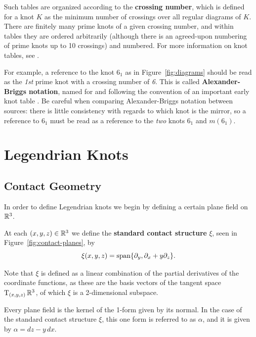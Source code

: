 Such tables are organized according to the \textbf{crossing number}, which is defined for a knot $K$ as the minimum number of crossings over all regular diagrams of $K$.
There are finitely many prime knots of a given crossing number, and within tables they are ordered arbitrarily (although there is an agreed-upon numbering of prime knots up to 10 crossings) and numbered. For more information on knot tables, see \cite{hoste}.

For example, a reference to the knot $6_1$ as in Figure~\ref{fig:diagrams} should be read as the \emph{1st} prime knot with a crossing number of \emph{6}. This is called \textbf{Alexander-Briggs notation}, named for and following the convention of an important early knot table \cite{alexander-briggs}. Be careful when comparing Alexander-Briggs notation between sources: there is little consistency with regards to which knot is the mirror, so a reference to $6_1$ must be read as a reference to the \emph{two} knots $6_1$ and $m(6_1)$.

\section{Legendrian Knots}\label{sec:legendrian}
\subsection{Contact Geometry}\label{subsec:contact}

In order to define Legendrian knots we begin by defining a certain plane field on $\mathbb{R}^3$.

\begin{definition}\label{defn:xi}
    At each $(x, y, z) \in \mathbb{R}^3$ we define the \textbf{standard contact structure} $\xi$, seen in Figure~\ref{fig:contact-planes}, by 
    \[
        \xi(x, y, z) = \operatorname{span} \{\partial_y, \partial_x + y\partial_z\}.
    \]
\end{definition}

Note that $\xi$ is defined as a linear combination of the partial derivatives of the coordinate functions, as these are the basis vectors of the tangent space $\operatorname{T}_{(x, y, z)} \mathbb{R}^3$, of which $\xi$ is a 2-dimensional subspace.

Every plane field is the kernel of the 1-form given by its normal. In the case of the standard contact structure $\xi$, this one form is referred to as $\alpha$, and it is given by ${\alpha = dz - y \, dx}$.

